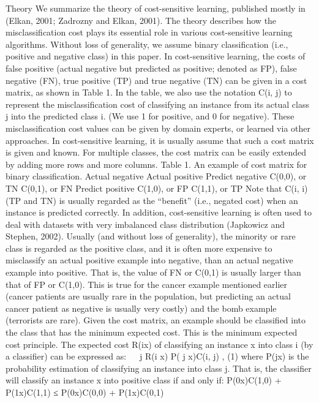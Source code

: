 \documentclass[
]{report}
\begin{document}
Theory
We summarize the theory of cost-sensitive learning, published mostly in (Elkan, 2001; Zadrozny
and Elkan, 2001). The theory describes how the misclassification cost plays its essential role in
various cost-sensitive learning algorithms.
Without loss of generality, we assume binary classification (i.e., positive and negative class) in
this paper. In cost-sensitive learning, the costs of false positive (actual negative but predicted as
positive; denoted as FP), false negative (FN), true positive (TP) and true negative (TN) can be
given in a cost matrix, as shown in Table 1. In the table, we also use the notation C(i, j) to
represent the misclassification cost of classifying an instance from its actual class j into the
predicted class i. (We use 1 for positive, and 0 for negative). These misclassification cost values
can be given by domain experts, or learned via other approaches. In cost-sensitive learning, it is
usually assume that such a cost matrix is given and known. For multiple classes, the cost matrix
can be easily extended by adding more rows and more columns.
Table 1. An example of cost matrix for binary classification.
Actual negative Actual positive
Predict negative C(0,0), or TN C(0,1), or FN
Predict positive C(1,0), or FP C(1,1), or TP
Note that C(i, i) (TP and TN) is usually regarded as the ``benefit'' (i.e., negated cost) when an
instance is predicted correctly. In addition, cost-sensitive learning is often used to deal with
datasets with very imbalanced class distribution (Japkowicz and Stephen, 2002). Usually (and
without loss of generality), the minority or rare class is regarded as the positive class, and it is
often more expensive to misclassify an actual positive example into negative, than an actual
negative example into positive. That is, the value of FN or C(0,1) is usually larger than that of
FP or C(1,0). This is true for the cancer example mentioned earlier (cancer patients are usually
rare in the population, but predicting an actual cancer patient as negative is usually very costly)
and the bomb example (terrorists are rare).
Given the cost matrix, an example should be classified into the class that has the minimum
expected cost. This is the minimum expected cost principle. The expected cost R(i\textbar x) of
classifying an instance x into class i (by a classifier) can be expressed as:
 
j
R(i \textbar{} x) P( j \textbar{} x)C(i, j) , (1)
where P(j\textbar x) is the probability estimation of classifying an instance into class j. That is, the
classifier will classify an instance x into positive class if and only if:
P(0\textbar x)C(1,0) + P(1\textbar x)C(1,1) ≤ P(0\textbar x)C(0,0) + P(1\textbar x)C(0,1)
\end{document}
